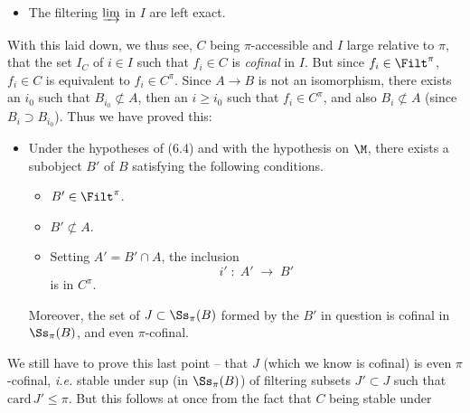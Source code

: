 \begin{itemize}
\item[(e$_0$)] The filtering $\varinjlim$ in $I$ are left exact.
\end{itemize}

With this laid down, we thus see, $C$ being $\pi$-accessible and $I$ large relative to $\pi$, that the set $I_C$ of $i \in I$ such that $f_i \in C$ is \textit{cofinal} in $I$. But since $f_i \in \Filt^{\pi}$, $f_i \in C$ is equivalent to $f_i \in C^{\pi}$. Since $A \longrightarrow B$ is not an isomorphism, there exists an $i_0$ such that $B_{i_0} \not\subset A$, then an $i \geq i_0$ such that $f_i \in C^{\pi}$, and also $B_i \not\subset A$ (since $B_i \supset B_{i_0}$). Thus we have proved this:

\begin{itemize}
\item[($*$)] Under the hypotheses of (6.4) and with the hypothesis  on $\M$, there exists a subobject $B'$ of $B$ satisfying the following conditions.
\begin{itemize}
\item[\textit{a})] $B' \in \Filt^{\pi}$.
\item[\textit{b})] $B' \not\subset A$.
\item[\textit{c})] Setting $A' = B' \cap A$, the inclusion
\[
i' \;:\; A' \;\longrightarrow\; B'
\]
is in $C^{\pi}$.
\end{itemize}


Moreover, the set of $J \subset \Ss_{\pi}(B)$ formed by the $B'$ in question is cofinal in $\Ss_{\pi}(B)$, and even $\pi$-cofinal.
\end{itemize}

We still have to prove this last point -- that $J$ (which we know is cofinal) is even $\pi$-cofinal, \textit{i.e.} stable under sup (in $\Ss_{\pi}(B)$) of filtering subsets $J' \subset J$ such that $\mathrm{card}\, J' \leq \pi$. But this follows at once from the fact that $C$ being stable under

